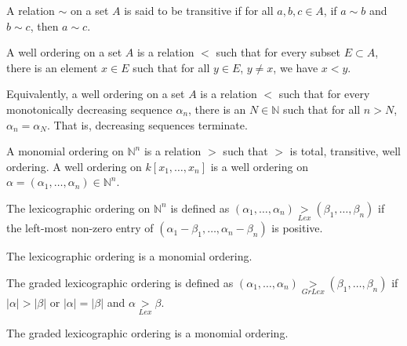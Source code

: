 \documentclass[crop=false,class=article,oneside]{standalone}
\begin{document}
        \begin{definition}
            A relation $\sim$ on a set $A$ is said to be
            transitive if for all $a,b,c\in A$, if $a\sim b$ and
            $b\sim c$, then $a\sim c$.
        \end{definition}
        \begin{definition}
            A well ordering on a set $A$ is a relation $<$
            such that for every subset $E\subset A$, there is an
            element $x\in E$ such that for all $y\in E$, $y\ne x$,
            we have $x<y$.
        \end{definition}
        \begin{remark}
            Equivalently, a well ordering on a set $A$
            is a relation $<$ such that for every monotonically
            decreasing sequence $\alpha_n$, there is an
            $N\in \mathbb{N}$ such that for all $n>N$,
            $\alpha_n = \alpha_N$. That is,
            decreasing sequences terminate.
        \end{remark}
        \begin{definition}
            A monomial ordering on $\mathbb{N}^n$ is a relation
            $>$ such that $>$ is total, transitive, well
            ordering. A well ordering on $k[x_1,\hdots ,x_n]$
            is a well ordering on
            $\alpha=(\alpha_1,\hdots,\alpha_n)\in\mathbb{N}^n$.
        \end{definition}
        \begin{definition}
            The lexicographic ordering on $\mathbb{N}^n$ is
            defined as
            $(\alpha_1,\hdots,\alpha_n)\underset{Lex}{>}%
             (\beta_1,\hdots,\beta_n)$
            if the left-most non-zero entry of
            $(\alpha_1-\beta_1,\hdots, \alpha_n-\beta_n)$
            is positive.
        \end{definition}
        \begin{theorem}
            The lexicographic ordering is a monomial ordering.
        \end{theorem}
        \begin{definition}
            The graded lexicographic ordering is defined as
            $(\alpha_1,\hdots,\alpha_n)\underset{GrLex}{>}%
             (\beta_1,\hdots, \beta_n)$
            if $|\alpha|>|\beta|$ or $|\alpha|=|\beta|$
            and $\alpha\underset{Lex}{>}\beta$.
        \end{definition}
        \begin{theorem}
            The graded lexicographic ordering is a monomial ordering.
        \end{theorem}
\end{document}
